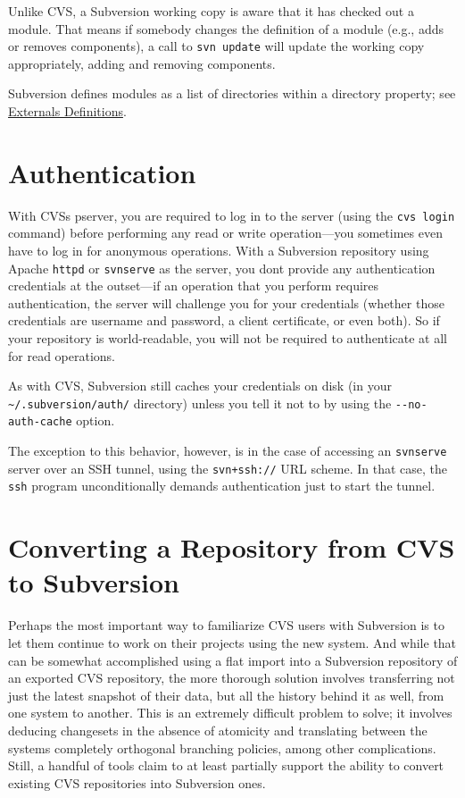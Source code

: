 Unlike CVS, a Subversion working copy is aware that it has checked out a
module. That means if somebody changes the definition of a module (e.g.,
adds or removes components), a call to \texttt{svn\ update} will update
the working copy appropriately, adding and removing components.

Subversion defines modules as a list of directories within a directory
property; see \hyperref[svn.advanced.externals]{Externals Definitions}.

\section{Authentication}\label{svn.forcvs.auth}

With CVS\textquotesingle s pserver, you are required to log in to the
server (using the \texttt{cvs\ login} command) before performing any
read or write operation---you sometimes even have to log in for
anonymous operations. With a Subversion repository using Apache
\texttt{httpd} or \texttt{svnserve} as the server, you
don\textquotesingle t provide any authentication credentials at the
outset---if an operation that you perform requires authentication, the
server will challenge you for your credentials (whether those
credentials are username and password, a client certificate, or even
both). So if your repository is world-readable, you will not be required
to authenticate at all for read operations.

As with CVS, Subversion still caches your credentials on disk (in your
\texttt{\textasciitilde{}/.subversion/auth/} directory) unless you tell
it not to by using the \texttt{-\/-no-auth-cache} option.

The exception to this behavior, however, is in the case of accessing an
\texttt{svnserve} server over an SSH tunnel, using the
\texttt{svn+ssh://} URL scheme. In that case, the \texttt{ssh} program
unconditionally demands authentication just to start the tunnel.

\section{Converting a Repository from CVS to
Subversion}\label{svn.forcvs.convert}

Perhaps the most important way to familiarize CVS users with Subversion
is to let them continue to work on their projects using the new system.
And while that can be somewhat accomplished using a flat import into a
Subversion repository of an exported CVS repository, the more thorough
solution involves transferring not just the latest snapshot of their
data, but all the history behind it as well, from one system to another.
This is an extremely difficult problem to solve; it involves deducing
changesets in the absence of atomicity and translating between the
systems\textquotesingle{} completely orthogonal branching policies,
among other complications. Still, a handful of tools claim to at least
partially support the ability to convert existing CVS repositories into
Subversion ones.

